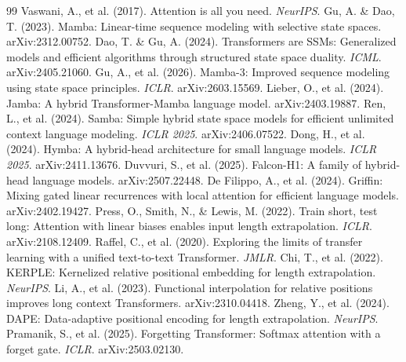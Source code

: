 \documentclass[11pt]{article}
\begin{document}

\begin{thebibliography}{99}
 Vaswani, A., et al. (2017). Attention is all you need. \emph{NeurIPS}.
 Gu, A. \& Dao, T. (2023). Mamba: Linear-time sequence modeling with selective state spaces. arXiv:2312.00752.
 Dao, T. \& Gu, A. (2024). Transformers are SSMs: Generalized models and efficient algorithms through structured state space duality. \emph{ICML}. arXiv:2405.21060.
 Gu, A., et al. (2026). Mamba-3: Improved sequence modeling using state space principles. \emph{ICLR}. arXiv:2603.15569.
 Lieber, O., et al. (2024). Jamba: A hybrid Transformer-Mamba language model. arXiv:2403.19887.
 Ren, L., et al. (2024). Samba: Simple hybrid state space models for efficient unlimited context language modeling. \emph{ICLR 2025}. arXiv:2406.07522.
 Dong, H., et al. (2024). Hymba: A hybrid-head architecture for small language models. \emph{ICLR 2025}. arXiv:2411.13676.
 Duvvuri, S., et al. (2025). Falcon-H1: A family of hybrid-head language models. arXiv:2507.22448.
 De Filippo, A., et al. (2024). Griffin: Mixing gated linear recurrences with local attention for efficient language models. arXiv:2402.19427.
 Press, O., Smith, N., \& Lewis, M. (2022). Train short, test long: Attention with linear biases enables input length extrapolation. \emph{ICLR}. arXiv:2108.12409.
 Raffel, C., et al. (2020). Exploring the limits of transfer learning with a unified text-to-text Transformer. \emph{JMLR}.
 Chi, T., et al. (2022). KERPLE: Kernelized relative positional embedding for length extrapolation. \emph{NeurIPS}.
 Li, A., et al. (2023). Functional interpolation for relative positions improves long context Transformers. arXiv:2310.04418.
 Zheng, Y., et al. (2024). DAPE: Data-adaptive positional encoding for length extrapolation. \emph{NeurIPS}.
 Pramanik, S., et al. (2025). Forgetting Transformer: Softmax attention with a forget gate. \emph{ICLR}. arXiv:2503.02130.

\end{thebibliography}
\end{document}
